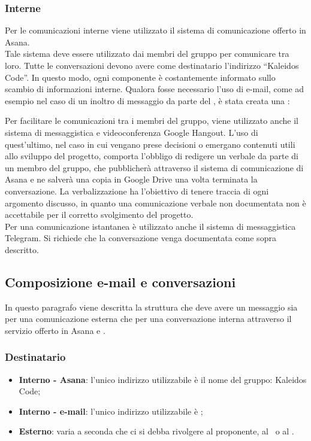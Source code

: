 \documentclass[../NormeDiProgetto.tex]{subfiles}
\begin{document}
			\subsubsection{Interne}
				Per le comunicazioni interne viene utilizzato il sistema di
				comunicazione offerto in Asana.\\
				Tale sistema deve essere utilizzato dai membri del gruppo
				per comunicare tra loro. Tutte le conversazioni devono avere
				come destinatario l'indirizzo ``Kaleidos Code''.
				In questo modo, ogni componente è costantemente informato sullo
				scambio di informazioni interne.
				Qualora fosse necessario l'uso di e-mail, come ad esempio nel caso di
				un inoltro di messaggio da parte del \responsabilediprogetto, è stata creata una :
				\begin{center}
					\mailinglist
				\end{center}
				Per facilitare le comunicazioni tra i membri del gruppo, viene
				utilizzato anche il sistema di messaggistica e videoconferenza
				Google Hangout.
				L'uso di quest'ultimo, nel caso in cui
				vengano prese decisioni	o emergano contenuti utili allo
				sviluppo del progetto, comporta l'obbligo di redigere un verbale
				da parte di un membro del gruppo, che pubblicherà attraverso il sistema
				di comunicazione di Asana e ne salverà una copia in Google Drive una volta
				terminata la conversazione. La verbalizzazione ha l'obiettivo di tenere
				traccia di ogni argomento discusso, in
				quanto una comunicazione verbale non documentata non è
				accettabile per il corretto svolgimento del progetto.\\
				Per una comunicazione istantanea è utilizzato anche il sistema
				di messaggistica Telegram. Si richiede che la conversazione
				venga documentata come sopra descritto.
			\subsection{Composizione e-mail e conversazioni}
				In questo paragrafo viene descritta la struttura che deve avere
				un messaggio sia per una comunicazione esterna che per una
				conversazione interna attraverso il servizio offerto in Asana e
				.
				\subsubsection{Destinatario}
					\begin{itemize}
						\item \textbf{Interno - Asana}: l'unico indirizzo utilizzabile è
						il nome del gruppo: Kaleidos Code;
						\item \textbf{Interno - e-mail}: l'unico indirizzo utilizzabile è
						\mailkaleidoscode;
						\item \textbf{Esterno}: varia a seconda che ci si debba
						rivolgere  al proponente, al \vardanega\ o al \cardin.
					\end{itemize}
\end{document}
